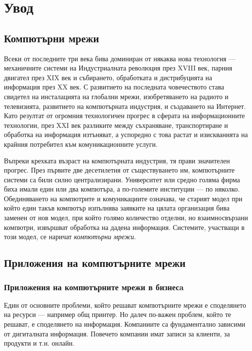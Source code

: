 \documentclass[12pt,a4paper,oneside]{book}
\begin{document}
\pagestyle{empty}

\pagestyle{plain}

\blankpage

\tableofcontents
\vfill
\chapter*{Увод}

\section{Компютърни мрежи}

Всеки от последните три века бива доминиран от някаква нова технология ---
механичните системи на Индустриалната революция през
XVIII век, парния двигател през XIX век и събирането, обработката и дистрибуцията
на информация през XX век. С развитието
на последната човечеството става свидетел на инсталацията на глобални мрежи,
изобретяването на радиото и телевизията, развитието на
компютърната индустрия, и създаването на Интернет. Като резултат от огромния
технологичен прогрес в сферата на информационните технологии, през XXI век
разликите между съхраняване, транспортиране и обработка на информация изтъняват,
а успоредно с това растат и изискванията на крайния потребител към
комуникационните услуги.

Въпреки крехката възраст на компютърната индустрия, тя прави значителен прогрес.
През първите две десетилетия от съществуването им, компютърните системи са били
силно централизирани.  Университет или средно голяма фирма биха имали един или
два компютъра, а по-големите институции --- по няколко. Обединяването на
компютрите и комуникациите означава, че старият модел при който един такъв
компютър изпълнява заявките на цялата организация бива заменен от нов модел, при
който голямо количество отделни, но взаимносвързани компютри, извършват обработка
на дадена информация. Системите, участващи в този модел, се наричат \textit{компютърни мрежи}.
\cite{tanenbaum_computer_2011}

\section{Приложения на компютърните мрежи}

\subsection{Приложения на компютърните мрежи в бизнесa}

Един от основните проблеми, който решават компютърните мрежи е споделянето на
ресурси --- например общ принтер. Но далеч по-важен проблем, който те решават,
е споделянето на информация. Компаниите са фундаментално зависими от дигиталната
информация. Повечето компании имат записи за клиенти, за продукти и т.н. онлайн.
\end{document}
